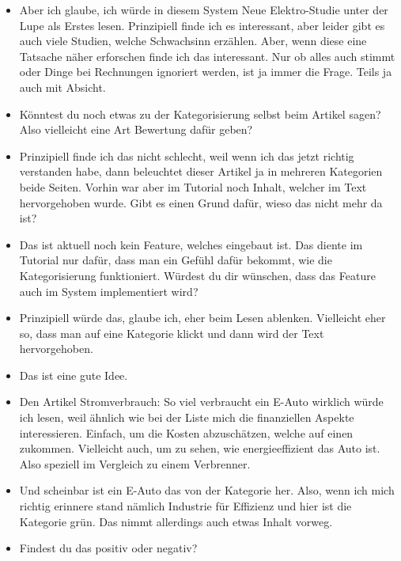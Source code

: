 {\begin{itemize}[]
        \item {} Aber ich glaube, ich würde in diesem System \flqq Neue Elektro-Studie unter der Lupe\frqq{} als Erstes lesen.
              Prinzipiell finde ich es interessant, aber leider gibt es auch viele Studien, welche Schwachsinn erzählen.
              Aber, wenn diese eine Tatsache näher erforschen finde ich das interessant.
              Nur ob alles auch stimmt oder Dinge bei Rechnungen ignoriert werden, ist ja immer die Frage.
              Teils ja auch mit Absicht.
        \item {} Könntest du noch etwas zu der Kategorisierung selbst beim Artikel sagen? Also vielleicht eine Art Bewertung dafür geben?
        \item {} Prinzipiell finde ich das nicht schlecht, weil wenn ich das jetzt richtig verstanden habe, dann beleuchtet dieser Artikel ja in mehreren Kategorien beide Seiten.
              Vorhin war aber im Tutorial noch Inhalt, welcher im Text hervorgehoben wurde. Gibt es einen Grund dafür, wieso das nicht mehr da ist?
        \item {} Das ist aktuell noch kein Feature, welches eingebaut ist.
              Das diente im Tutorial nur dafür, dass man ein Gefühl dafür bekommt, wie die Kategorisierung funktioniert.
              Würdest du dir wünschen, dass das Feature auch im System implementiert wird?
        \item {} Prinzipiell würde das, glaube ich, eher beim Lesen ablenken.
              Vielleicht eher so, dass man auf eine Kategorie klickt und dann wird der Text hervorgehoben.
        \item {} Das ist eine gute Idee.
        \item {} Den Artikel \flqq Stromverbrauch: So viel verbraucht ein E-Auto wirklich\frqq{} würde ich lesen, weil ähnlich wie bei der Liste mich die finanziellen Aspekte interessieren.
              Einfach, um die Kosten abzuschätzen, welche auf einen zukommen.
              Vielleicht auch, um zu sehen, wie energieeffizient das Auto ist.
              Also speziell im Vergleich zu einem Verbrenner.
        \item {} Und scheinbar ist ein E-Auto das von der Kategorie her.
              Also, wenn ich mich richtig erinnere stand nämlich Industrie für Effizienz und hier ist die Kategorie grün.
              Das nimmt allerdings auch etwas Inhalt vorweg.
        \item {} Findest du das positiv oder negativ?

\end{itemize}}
